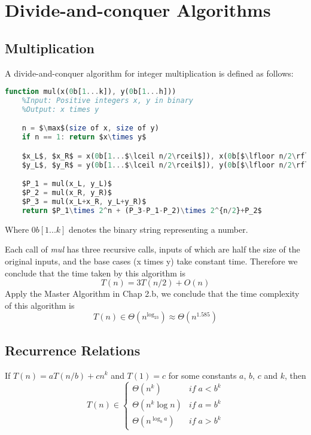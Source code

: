 \section{Divide-and-conquer Algorithms}

\subsection{Multiplication}

\begin{definition}
A divide-and-conquer algorithm for integer multiplication is defined as follows:
\begin{lstlisting}[mathescape=true, language=Octave]
function mul(x(0b[1...k]), y(0b[1...h]))
	%Input: Positive integers x, y in binary
	%Output: x times y

	n = $\max$(size of x, size of y)
	if n == 1: return $x\times y$

	$x_L$, $x_R$ = x(0b[1...$\lceil n/2\rceil$]), x(0b[$\lfloor n/2\rfloor$...n])
	$y_L$, $y_R$ = y(0b[1...$\lceil n/2\rceil$]), y(0b[$\lfloor n/2\rfloor$...n])

	$P_1 = mul(x_L, y_L)$
	$P_2 = mul(x_R, y_R)$
	$P_3 = mul(x_L+x_R, y_L+y_R)$
	return $P_1\times 2^n + (P_3-P_1-P_2)\times 2^{n/2}+P_2$
\end{lstlisting}
Where $0b[1...k]$ denotes the binary string representing a number.
\end{definition}
Each call of \textit{mul} has three recursive calls, inputs of which are half the size of the original inputs, and the base cases (x times y) take constant time. Therefore we conclude that the time taken by this algorithm is
\[
T(n) = 3T(n/2)+O(n)
\]
Apply the Master Algorithm in Chap 2.b, we conclude that the time complexity of this algorithm is
\[
T(n) \in \Theta(n^{\log_23}) \approx \Theta(n^{1.585})
\]

\subsection{Recurrence Relations}

\begin{theorem}
If $T(n) = aT(n/b) + cn^k$ and $T(1) = c$ for some constants $a$, $b$, $c$ and $k$, then
\begin{equation*}
T(n) \in \begin{cases}
\Theta(n^k) &if \; a<b^k \\
\Theta(n^k\log n) &if \; a=b^k \\
\Theta(n^{\log_ba}) &if \; a>b^k
\end{cases}
\end{equation*}
\end{theorem}

